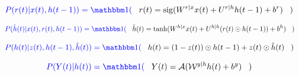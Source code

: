\begin{align}\color{blue}
P(r(t)|x(t), h(t-1))=\indi(\;\;\;&
r(t) = \sig(W^{r|x} x(t) + U^{r|h} h(t-1) + b^r)
\;\;\;)
\end{align}

\begin{align}\color{blue}
P(\hat{h}(t)|x(t), r(t), h(t-1))=
\indi(\;\;\;&
\hat{h}(t) = \tanh(W^{h|x} x(t) +
 U^{h|h} (r(t) \odot h(t-1)) + b^h)
\;\;\;)
\end{align}

\begin{align}\color{blue}
P(h(t)|z(t), h(t-1),\hat{h}(t))=\indi(\;\;\;&
h(t) =  (1 - z(t)) \odot h(t-1) +
 z(t) \odot \hat{h}(t)
\;\;\;)
\end{align}

\begin{align}\color{blue}
P(Y(t)|h(t))=\indi(\;\;\;&
Y(t)= \cala(\calw^{y|h}h(t) + b^y)\;\;\;)
\end{align}